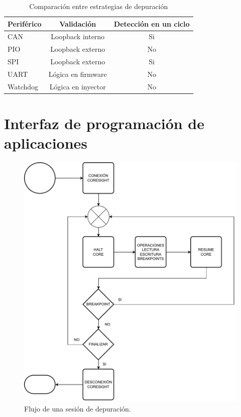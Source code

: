 \begin{table}[h]
	\centering
	\caption[Estrategias de depuración]{Comparación entre estrategias de depuración}

	\begin{tabular}{l c c}    
		\toprule
        \textbf{Periférico} & \textbf{Validación}       & \textbf{Detección en un ciclo}\\
		\midrule
		CAN                 & Loopback interno          & Si\\		
		PIO                 & Loopback externo          & No\\
		SPI                 & Loopback externo          & Si\\
		UART                & Lógica en firmware        & No\\
		Watchdog            & Lógica en inyector        & No\\
		\bottomrule
		\hline
	\end{tabular}
	\label{tab:perifericos}
\end{table}

\section{Interfaz de programación de aplicaciones}
\label{sec:api}

\begin{figure}[htbp]
	\centering
	\includegraphics[width=\textwidth]{./Figures/debugsession.pdf}
    \caption{Flujo de una sesión de depuración.}
	\label{fig:debugsession}
\end{figure}


